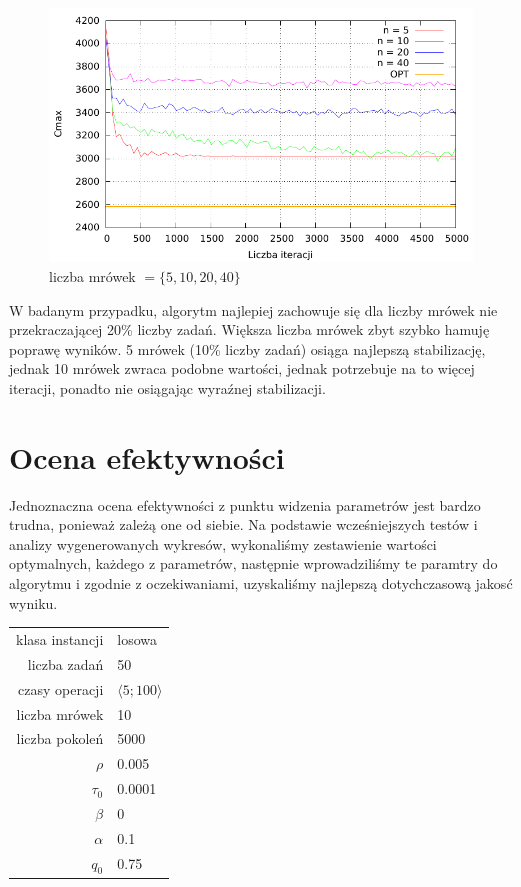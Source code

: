 \documentclass[10pt,a4paper]{article}
\begin{document}
\begin{figure}[h]
    \centering
    \includegraphics{./figures/inst_01_rnd_antno_smooth.pdf}
    \caption{liczba mrówek $= \{ 5, 10, 20, 40 \} $}
\end{figure}
\vspace{15mm}
W badanym przypadku, algorytm najlepiej zachowuje się dla liczby mrówek nie
przekraczającej 20\% liczby zadań.  Większa liczba mrówek zbyt szybko hamuję
poprawę wyników. 5 mrówek (10\% liczby zadań) osiąga najlepszą stabilizację,
jednak 10 mrówek zwraca podobne wartości, jednak potrzebuje na to więcej
iteracji, ponadto nie osiągając wyraźnej stabilizacji.

\newpage
\section{Ocena efektywności}
Jednoznaczna ocena efektywności z punktu widzenia parametrów jest bardzo
trudna, ponieważ zależą one od siebie.  Na podstawie wcześniejszych testów i
analizy wygenerowanych wykresów, wykonaliśmy zestawienie wartości optymalnych,
każdego z parametrów, następnie wprowadziliśmy te paramtry do algorytmu i
zgodnie z oczekiwaniami, uzyskaliśmy najlepszą dotychczasową jakosć wyniku.

\vspace{6 mm}
\begin{center}
\begin{tabular}{|r|l|}
  \hline
  klasa instancji & losowa \\
  liczba zadań & 50 \\
  czasy operacji & $ \langle 5;100 \rangle $  \\
  liczba mrówek & 10\\
  liczba pokoleń & 5000 \\
  $ \rho $ & 0.005 \\
  $ \tau_0 $ & 0.0001 \\
  $ \beta $ & 0 \\
  $ \alpha $ & 0.1 \\
  $ q_0 $ & 0.75 \\
  \hline
\end{tabular}
\end{center}
\end{document}
